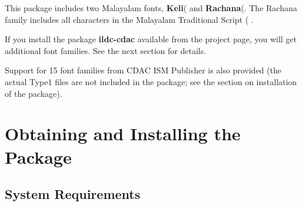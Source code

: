 \documentclass[12pt]{article}
\begin{document}
This package includes two Malayalam fonts, {\bf Keli}{\mm (\-\-}
and {\bf Rachana}{\mm (\-\-\-}. The Rachana family includes
all characters in the Malayalam Traditional Script {\mm (\-\-\-
\-\-}.

If you install the package \textbf{ildc-cdac} available from the project page,
you will get additional font families. See the next section for details.

Support for 15 font families from CDAC ISM Publisher
is also provided (the actual Type1 files are not included in
the package; see the section on installation of the package).

\vfill\eject

\section{Obtaining and Installing the Package}

\subsection{System Requirements}
\end{document}
